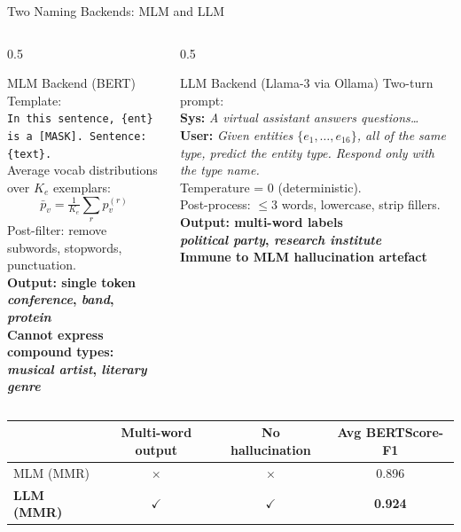 \documentclass[aspectratio=169,10pt]{beamer}
\newcommand{\hg}[1]{\textcolor{dkgreen}{\textbf{#1}}}
\newcommand{\hr}[1]{\textcolor{dkred}{\textbf{#1}}}
\newcommand{\cmark}{\textcolor{dkgreen}{$\checkmark$}}
\newcommand{\xmark}{\textcolor{dkred}{$\times$}}
\begin{document}
\begin{frame}{Two Naming Backends: MLM and LLM}
  \begin{columns}[T]
    \begin{column}{0.5\textwidth}
      \begin{block}{MLM Backend (BERT)}
        \small
        Template:\\
        \texttt{In this sentence, \{ent\} is a [MASK]. Sentence: \{text\}.}\\[4pt]
        Average vocab distributions over $K_e$ exemplars:
        \[
          \bar{p}_v = \tfrac{1}{K_e}\textstyle\sum_r p_v^{(r)}
        \]
        Post-filter: remove subwords, stopwords, punctuation.\\[4pt]
        \textbf{Output: single token}\\
        \hg{\textit{conference}, \textit{band}, \textit{protein}}\\[4pt]
        \hr{Cannot express compound types:\\
        \textit{musical artist}, \textit{literary genre}}
      \end{block}
    \end{column}
    \begin{column}{0.5\textwidth}
      \begin{block}{LLM Backend (Llama-3 via Ollama)}
        \small
        Two-turn prompt:\\
        \textbf{Sys:} \textit{A virtual assistant answers questions\ldots}\\
        \textbf{User:} \textit{Given entities $\{e_1,\ldots,e_{16}\}$, all of the same type, predict the entity type. Respond only with the type name.}\\[4pt]
        Temperature = 0 (deterministic).\\
        Post-process: $\leq$3 words, lowercase, strip fillers.\\[4pt]
        \textbf{Output: multi-word labels}\\
        \hg{\textit{political party}, \textit{research institute}}\\[4pt]
        \hg{Immune to MLM hallucination artefact}
      \end{block}
    \end{column}
  \end{columns}
  \vspace{0.4em}
  \begin{center}
    \small
    \begin{tabular}{lccc}
      \toprule
      & \textbf{Multi-word output} & \textbf{No hallucination} & \textbf{Avg BERTScore-F1} \\
      \midrule
      MLM (MMR) & \xmark & \xmark & 0.896 \\
      \textbf{LLM (MMR)} & \cmark & \cmark & \textbf{0.924} \\
      \bottomrule
    \end{tabular}
  \end{center}
\end{frame}
\end{document}
